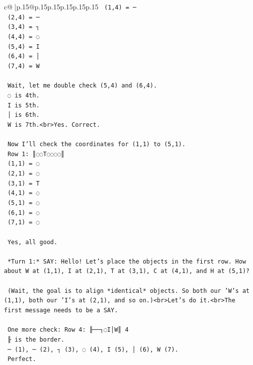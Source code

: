 \documentclass{article}
\begin{document}
{\begin{supertabular}{c@{$\;$}|p{.15\linewidth}@{}p{.15\linewidth}p{.15\linewidth}p{.15\linewidth}p{.15\linewidth}p{.15\linewidth}}
{{{\texttt{    (1,4) = ─} \\
\texttt{    (2,4) = ─} \\
\texttt{    (3,4) = ┐} \\
\texttt{    (4,4) = ◌} \\
\texttt{    (5,4) = I} \\
\texttt{    (6,4) = │} \\
\texttt{    (7,4) = W} \\
\\ 
\texttt{    Wait, let me double check (5,4) and (6,4).} \\
\texttt{    ◌ is 4th.} \\
\texttt{    I is 5th.} \\
\texttt{    │ is 6th.} \\
\texttt{    W is 7th.<br>Yes. Correct.} \\
\\ 
\texttt{    Now I'll check the coordinates for (1,1) to (5,1).} \\
\texttt{    Row 1: ║◌◌T◌◌◌◌║} \\
\texttt{    (1,1) = ◌} \\
\texttt{    (2,1) = ◌} \\
\texttt{    (3,1) = T} \\
\texttt{    (4,1) = ◌} \\
\texttt{    (5,1) = ◌} \\
\texttt{    (6,1) = ◌} \\
\texttt{    (7,1) = ◌} \\
\\ 
\texttt{    Yes, all good.} \\
\\ 
\texttt{    *Turn 1:* SAY: Hello! Let's place the objects in the first row. How about W at (1,1), I at (2,1), T at (3,1), C at (4,1), and H at (5,1)?} \\
\\ 
\texttt{    (Wait, the goal is to align *identical* objects. So both our 'W's at (1,1), both our 'I's at (2,1), and so on.)<br>Let's do it.<br>The first message needs to be a SAY.} \\
\\ 
\texttt{    One more check: Row 4: ╟──┐◌I│W║ 4} \\
\texttt{    ╟ is the border.} \\
\texttt{    ─ (1), ─ (2), ┐ (3), ◌ (4), I (5), │ (6), W (7).} \\
\texttt{    Perfect.} \\
\\ 
}}}
\end{supertabular}}
\end{document}
